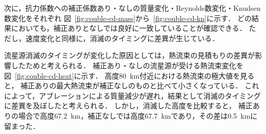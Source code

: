 次に，抗力係数への補正係数あり・なしの質量変化・Reynolds数変化・Knudsen数変化をそれぞれ
図~\ref{fig:couble-cd-mass}から~\ref{fig:couble-cd-kn}に示す．
どの結果においても，補正ありとなしでは良好に一致していることが確認できる．
ただし，速度変化と同様に，消滅のタイミングに差異が生じている．

流星源消滅のタイミングが変化した原因としては，熱流束の見積もりの差異が影響したためと考えられる．
補正あり・なしの流星源が受ける熱流束変化を図~\ref{fig:couble-cd-heat}に示す．
高度80~km付近における熱流束の極大値を見ると，
補正ありの最大熱流束が補正なしのものと比べて小さくなっている．
これによって，アブレーションによる質量減少が遅れ，結果として消滅のタイミングに差異を及ぼしたと考えられる．
しかし，消滅した高度を比較すると，
補正ありの場合で高度67.2~km，補正なしでは高度67.7~kmであり，その差は0.5~kmに留まった．

